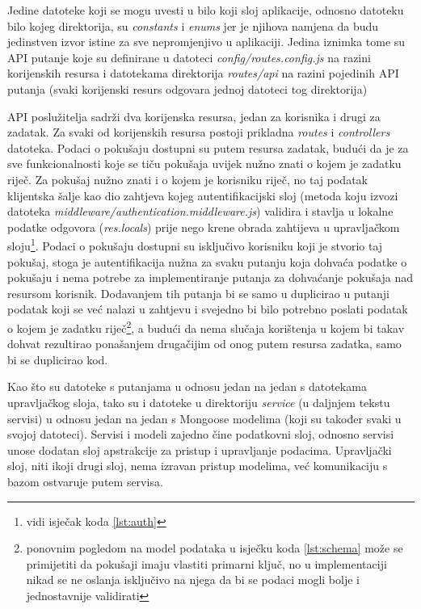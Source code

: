 \documentclass[times, utf8, diplomski, numeric]{fer}
\begin{document}
Jedine datoteke koji se mogu uvesti u bilo koji sloj aplikacije, odnosno datoteku bilo kojeg direktorija, su \emph{constants} i \emph{enums} jer je njihova namjena da budu jedinstven izvor istine  za sve nepromjenjivo u aplikaciji.
Jedina iznimka tome su API putanje koje su definirane u datoteci \emph{config/routes.config.js} na razini korijenskih resursa i datotekama direktorija \emph{routes/api} na razini pojedinih API putanja (svaki korijenski resurs odgovara jednoj datoteci tog direktorija)

API poslužitelja sadrži dva korijenska resursa, jedan za korisnika i drugi za zadatak.
Za svaki od korijenskih resursa postoji prikladna \emph{routes} i \emph{controllers} datoteka.
Podaci o pokušaju dostupni su putem resursa zadatak, budući da je za sve funkcionalnosti koje se tiču pokušaja uvijek nužno znati o kojem je zadatku riječ.
Za pokušaj nužno znati i o kojem je korisniku riječ, no taj podatak klijentska šalje kao dio zahtjeva kojeg  autentifikacijski sloj (metoda koju izvozi datoteka \emph{middleware/authentication.middleware.js}) validira i stavlja u lokalne podatke odgovora (\emph{res.locals}) prije nego krene obrada zahtijeva u upravljačkom sloju\footnote{vidi isječak koda \ref{lst:auth}}.
Podaci o pokušaju dostupni su isključivo korisniku koji je stvorio taj pokušaj, stoga je autentifikacija nužna za svaku putanju koja dohvaća podatke o pokušaju i nema potrebe za implementiranje putanja za dohvaćanje pokušaja nad resursom  korisnik. Dodavanjem tih putanja bi se samo u duplicirao u putanji podatak koji se već nalazi u zahtjevu i svejedno bi bilo potrebno poslati podatak o kojem je zadatku riječ\footnote{
    ponovnim pogledom na model podataka u isječku koda \ref{lst:schema} može se primijetiti da pokušaji imaju vlastiti primarni ključ, no u implementaciji nikad se ne oslanja isključivo na njega da bi se podaci mogli bolje i jednostavnije validirati
}, a budući da nema slučaja korištenja u kojem bi takav dohvat rezultirao ponašanjem drugačijim od onog putem resursa zadatka, samo bi se duplicirao kod.

Kao što su datoteke s putanjama u odnosu jedan na jedan s datotekama upravljačkog sloja, tako su i datoteke u direktoriju \emph{service} (u daljnjem tekstu servisi) u odnosu jedan na jedan s Mongoose modelima (koji su također svaki u svojoj datoteci).
Servisi i modeli zajedno čine podatkovni sloj, odnosno servisi unose dodatan sloj apstrakcije za pristup i upravljanje podacima.
Upravljački sloj, niti ikoji drugi sloj, nema izravan pristup modelima, već komunikaciju s bazom ostvaruje putem servisa.
\end{document}
